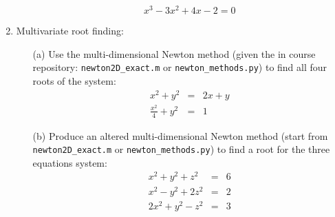 \documentclass{article}
\begin{document}
\begin{enumerate}
\begin{itemize}
    \begin{equation}
      x^3-3x^2+4x-2=0
    \end{equation}  
  \end{itemize}
  \item Multivariate root finding:
  \begin{itemize}
    \item[(a)]  Use the multi-dimensional Newton method (given the in course repository:  \texttt{newton2D\_exact.m} or \texttt{newton\_methods.py}) to find all four roots of the system:
    \begin{eqnarray}
      x^2+y^2&=&2x+y \\
      \frac{x^2}{4}+y^2&=&1      
    \end{eqnarray}
    \item[(b)]  Produce an altered multi-dimensional Newton method (start from \texttt{newton2D\_exact.m} or \texttt{newton\_methods.py}) to find a root for the three equations system:
    \begin{eqnarray}
      x^2+y^2+z^2&=&6\\
      x^2-y^2+2z^2&=&2\\
      2x^2+y^2-z^2&=&3   
    \end{eqnarray}    
  \end{itemize}
\end{enumerate}
\end{document}
